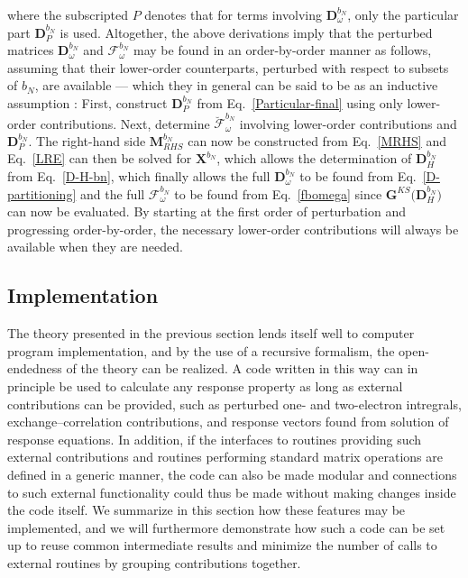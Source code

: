 \documentclass[%
 reprint,
 amsmath,amssymb,
 aps,
]{revtex4-1}
\begin{document}
where the subscripted $P$ denotes that for terms involving $\mathbf{D}^{b_N}_{\omega}$, only the particular part $\mathbf{D}^{b_N}_{P}$ is used. Altogether, the above derivations imply that the perturbed matrices $\mathbf{D}^{b_N}_{\omega}$ and $\bm{\mathcal{F}}^{b_{N}}_{\omega}$ may be found in an order-by-order manner as follows, assuming that their lower-order counterparts, perturbed with respect to subsets of $b_{N}$, are available --- which they in general can be said to be as an inductive assumption : First, construct $\mathbf{D}^{b_N}_{P}$ from Eq.~\eqref{Particular-final} using only lower-order contributions. Next, determine $\breve{\bm{\mathcal{F}}}^{b_{N}}_{\omega}$ involving lower-order contributions and $\mathbf{D}^{b_N}_{P}$. The right-hand side $\mathbf{M}_{RHS}^{b_N}$ can now be constructed from Eq.~\eqref{MRHS}  and Eq.~\eqref{LRE} can then be solved for $\mathbf{X}^{b_N}$, which allows the determination of $\mathbf{D}_{H}^{b_N}$ from Eq.~\eqref{D-H-bn}, which finally allows the full $\mathbf{D}^{b_N}_{\omega}$ to be found from Eq.~\eqref{D-partitioning} and the full $\bm{\mathcal{F}}^{b_{N}}_{\omega}$ to be found from Eq.~\eqref{fbomega} since $\mathbf{G}^{KS} \bigl( \mathbf{D}_{H}^{b_{N}} \bigr)$ can now be evaluated. By starting at the first order of perturbation and progressing order-by-order, the necessary lower-order contributions will always be available when they are needed.









\subsection{Implementation}
\label{routines}

The theory presented in the previous section lends itself well to computer program implementation, and by the use of a recursive formalism, the open-endedness of the theory can be realized. A code written in this way can in principle be used to calculate any response property as long as external contributions can be provided, such as perturbed one- and two-electron intregrals, exchange--correlation contributions, and response vectors found from solution of response equations. In addition, if the interfaces to routines providing such external contributions and routines performing standard matrix operations are defined in a generic manner, the code can also be made modular and connections to such external functionality could thus be made without making changes inside the code itself. We summarize in this section how these features may be implemented, and we will furthermore demonstrate how such a code can be set up to reuse common intermediate results and minimize the number of calls to external routines by grouping contributions together.
\end{document}
